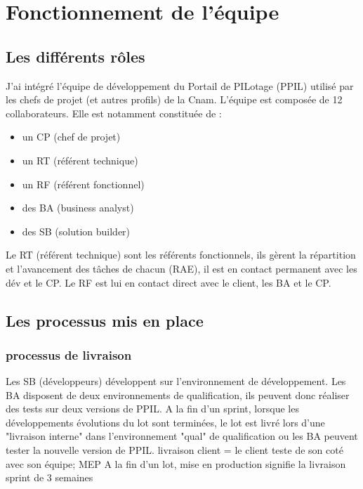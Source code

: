 \section{Fonctionnement de l'équipe}
\subsection{Les différents rôles}
J'ai intégré l'équipe de développement du Portail de PILotage (PPIL) utilisé par les chefs de projet (et autres profils) de la Cnam. L'équipe est composée de 12 collaborateurs. Elle est notamment constituée de :
\begin{itemize}
    \item un CP (chef de projet) 
    \item un RT (référent technique)
    \item un RF (référent fonctionnel)
    \item des BA (business analyst)
    \item des SB (solution builder)
\end{itemize}
Le RT (référent technique) sont les référents fonctionnels, ils gèrent la répartition et l'avancement des tâches de chacun (RAE), il est en contact permanent avec les dév et le CP. Le RF est lui en contact direct avec le client, les BA et le CP.
\subsection{Les processus mis en place}
\subsubsection{processus de livraison}
Les SB (développeurs) développent sur l'environnement de développement.
Les BA disposent de deux environnements de qualification, ils peuvent donc réaliser des tests sur deux versions de PPIL.
A la fin d'un sprint, lorsque les développements évolutions du lot sont terminées, le lot est livré lors d'une "livraison interne" dans l'environnement "qual" de qualification ou les BA peuvent tester la nouvelle version de PPIL.
livraison client = le client teste de son coté avec son équipe;
MEP A la fin d'un lot, mise en production signifie la livraison
sprint de 3 semaines
